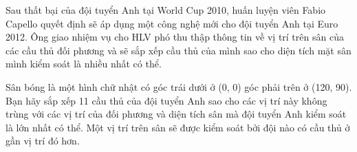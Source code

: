 Sau thất bại của đội tuyển Anh tại World Cup 2010, huấn luyện viên Fabio Capello quyết định sẽ áp dụng một công nghệ mới cho đội tuyển Anh tại Euro 2012. Ông giao nhiệm vụ cho HLV phó thu thập thông tin về vị trí trên sân của các cầu thủ đối phương và sẽ sắp xếp cầu thủ của mình sao cho diện tích mặt sân mình kiểm soát là nhiều nhất có thể.

Sân bóng là một hình chữ nhật có góc trái dưới ở (0, 0) góc phải trên ở (120, 90). Bạn hãy sắp xếp 11 cầu thủ của đội tuyển Anh sao cho các vị trí này không trùng với các vị trí của đối phương và diện tích sân mà đội tuyển Anh kiểm soát là lớn nhất có thể. Một vị trí trên sân sẽ được kiểm soát bởi đội nào có cầu thủ ở gần vị trí đó hơn.